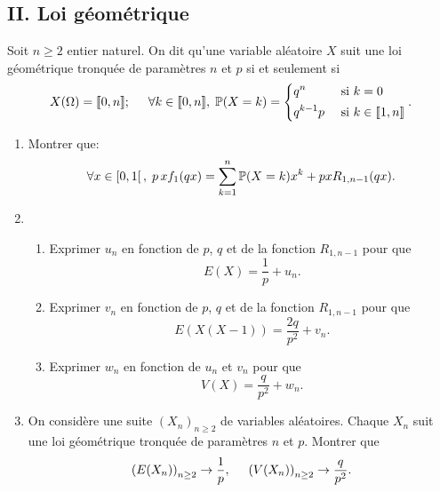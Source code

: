 \subsection*{II. Loi géométrique}
Soit $n\geq 2$ entier naturel. On dit qu'une variable aléatoire $X$ suit une loi géométrique tronquée de paramètres $n$ et $p$ si et seulement si
\[
  X(\Omega) = \llbracket 0, n\rrbracket;\hspace{0.5cm}
  \forall k \in \llbracket 0, n\rrbracket,\; \mathbb{P}(X = k) =
  \left\lbrace
  \begin{aligned}
    &q^n &\text{ si }& k= 0\\
    &q^{k-1}p &\text{ si }& k \in \llbracket 1,n\rrbracket
  \end{aligned}
  \right. .
\]
\begin{enumerate}
  \item Montrer que:
\[
  \forall x \in \left[0,1 \right[, \; p\, xf_1(qx) = \sum_{k=1}^{n} \mathbb{P}(X = k) x^k + pxR_{1,n-1}(qx) . 
\]
  \item 
  \begin{enumerate}
    \item Exprimer $u_n$ en fonction de $p$, $q$ et de la fonction $R_{1, n-1}$ pour que 
\[
  E(X) = \frac{1}{p} +u_n. 
\]

    \item Exprimer $v_n$ en fonction de $p$, $q$ et de la fonction $R_{1, n-1}$ pour que 
\[
  E(X(X-1)) = \frac{2q}{p^2} + v_n. 
\]
    \item Exprimer $w_n$ en fonction de $u_n$ et $v_n$ pour que 
\[
  V(X) = \frac{q}{p^2} + w_n.
\]
  \end{enumerate}

  \item On considère une suite $\left( X_n\right)_{n\geq 2}$ de variables aléatoires. Chaque $X_n$ suit une loi géométrique tronquée de paramètres $n$ et $p$. Montrer que 
\[
  \left( E(X_n)\right)_{n\geq 2} \rightarrow \frac{1}{p}, \hspace{0.5cm} \left( V(X_n)\right)_{n\geq 2} \rightarrow \frac{q}{p^2}.
\]


\end{enumerate}


